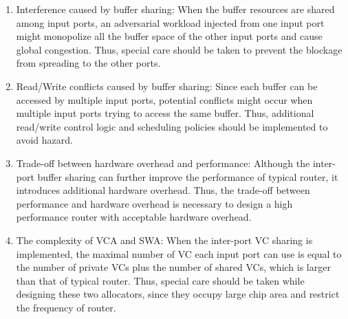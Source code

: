 \documentclass[10pt,conference]{IEEEtran}
\begin{document}
\begin{enumerate}
\item Interference caused by buffer sharing: When the buffer resources are shared among input ports, an adversarial workload injected from one input port might monopolize all the buffer space of the other input ports and cause global congestion. Thus, special care should be taken to prevent the blockage from spreading to the other ports.

\item Read/Write conflicts caused by buffer sharing: Since each buffer can be accessed by multiple input ports, potential conflicts might occur when multiple input ports trying to access the same buffer. Thus, additional read/write control logic and scheduling policies should be implemented to avoid hazard.

\item Trade-off between hardware overhead and performance: Although the inter-port buffer sharing can further improve the performance of typical router, it introduces additional hardware overhead. Thus, the trade-off between performance and hardware overhead is necessary to design a high performance router with acceptable hardware overhead.

\item The complexity of VCA and SWA: When the inter-port VC sharing is implemented, the maximal number of VC each input port can use is equal to the number of private VCs plus the number of shared VCs, which is larger than that of typical router. Thus, special care should be taken while designing these two allocators, since they occupy large chip area and restrict the frequency of router.

\end{enumerate}
\end{document}
